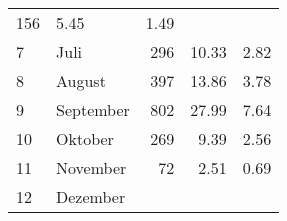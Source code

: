 \begin{longtable}{lXrrr}
       \num{156} &
       \num[round-mode=places,round-precision=2]{5,45} &
         \num[round-mode=places,round-precision=2]{1,49} \\

     7 &
     \multicolumn{1}{X}{ Juli   } &


       \num{296} &
       \num[round-mode=places,round-precision=2]{10,33} &
         \num[round-mode=places,round-precision=2]{2,82} \\

     8 &
     \multicolumn{1}{X}{ August   } &


       \num{397} &
       \num[round-mode=places,round-precision=2]{13,86} &
         \num[round-mode=places,round-precision=2]{3,78} \\

     9 &
     \multicolumn{1}{X}{ September   } &


       \num{802} &
       \num[round-mode=places,round-precision=2]{27,99} &
         \num[round-mode=places,round-precision=2]{7,64} \\

     10 &
     \multicolumn{1}{X}{ Oktober   } &


       \num{269} &
       \num[round-mode=places,round-precision=2]{9,39} &
         \num[round-mode=places,round-precision=2]{2,56} \\

     11 &
     \multicolumn{1}{X}{ November   } &


       \num{72} &
       \num[round-mode=places,round-precision=2]{2,51} &
         \num[round-mode=places,round-precision=2]{0,69} \\

     12 &
     \multicolumn{1}{X}{ Dezember   } &



\end{longtable}
